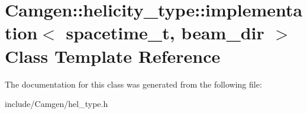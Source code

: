 \hypertarget{a00288}{\section{Camgen\-:\-:helicity\-\_\-type\-:\-:implementation$<$ spacetime\-\_\-t, beam\-\_\-dir $>$ Class Template Reference}
\label{a00288}
}


The documentation for this class was generated from the following file\-:\begin{DoxyCompactItemize}
\item 
include/\-Camgen/hel\-\_\-type.\-h\end{DoxyCompactItemize}

